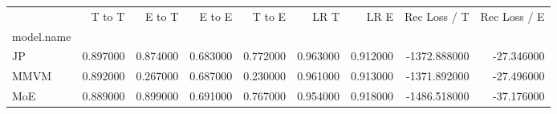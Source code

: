 \begin{tabular}{lrrrrrrrr}
\toprule
 & T to T & E to T & E to E & T to E & LR T & LR E & Rec Loss / T & Rec Loss / E \\
model.name &  &  &  &  &  &  &  &  \\
\midrule
JP & 0.897000 & 0.874000 & 0.683000 & 0.772000 & 0.963000 & 0.912000 & -1372.888000 & -27.346000 \\
MMVM & 0.892000 & 0.267000 & 0.687000 & 0.230000 & 0.961000 & 0.913000 & -1371.892000 & -27.496000 \\
MoE & 0.889000 & 0.899000 & 0.691000 & 0.767000 & 0.954000 & 0.918000 & -1486.518000 & -37.176000 \\
\bottomrule
\end{tabular}
